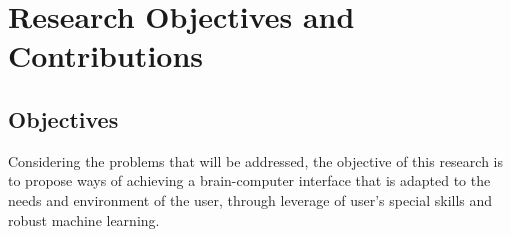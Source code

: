 
\section{Research Objectives and Contributions}

\subsection{Objectives}
Considering the problems that will be addressed, the objective of this research is to propose ways of achieving a brain-computer interface that is adapted to the needs and environment of the user,  through leverage of user's special skills and robust machine learning.
 
